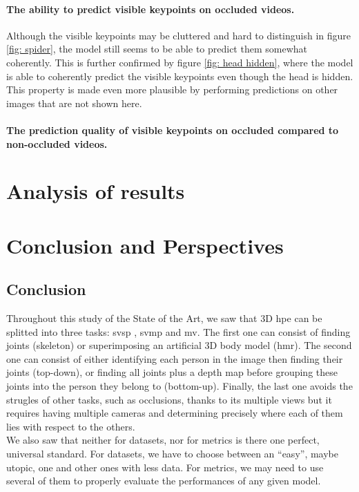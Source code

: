 \documentclass[runningheads]{llncs}
\begin{document}
\paragraph{The ability to predict visible keypoints on occluded videos.}
Although the visible keypoints may be cluttered and hard to distinguish in figure \ref{fig: spider}, the model still seems to be able to predict them somewhat coherently. This is further confirmed by figure \ref{fig: head hidden}, where the model is able to coherently predict the visible keypoints even though the head is hidden. This property is made even more plausible by performing predictions on other images that are not shown here.
\paragraph{The prediction quality of visible keypoints on occluded compared to non-occluded videos.}


\section{Analysis of results}
\section{Conclusion and Perspectives}
\subsection{Conclusion}
Throughout this study of the State of the Art, we saw that 3D \ac{hpe} can be splitted into three tasks: \ac{svsp} , \ac{svmp} and \ac{mv}. The first one can consist of finding joints (skeleton) or superimposing an artificial 3D body model (\ac{hmr}). The second one can consist of either identifying each person in the image then finding their joints (top-down), or finding all joints plus a depth map before grouping these joints into the person they belong to (bottom-up). Finally, the last one avoids the strugles of other tasks, such as occlusions, thanks to its multiple views but it requires having multiple cameras and determining precisely where each of them lies with respect to the others. \\
We also saw that neither for datasets, nor for metrics is there one perfect, universal standard. For datasets, we have to choose between an ``easy'', maybe utopic, one and other ones with less data. For metrics, we may need to use several of them to properly evaluate the performances of any given model.
\end{document}
